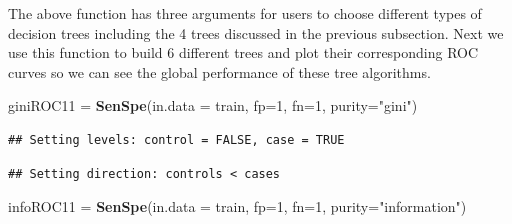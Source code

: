 \documentclass[
]{book}
\newenvironment{Shaded}{\begin{snugshade}}{\end{snugshade}}
\newcommand{\AttributeTok}[1]{\textcolor[rgb]{0.13,0.29,0.53}{#1}}
\newcommand{\DecValTok}[1]{\textcolor[rgb]{0.00,0.00,0.81}{#1}}
\newcommand{\DocumentationTok}[1]{\textcolor[rgb]{0.56,0.35,0.01}{\textbf{\textit{#1}}}}
\newcommand{\FunctionTok}[1]{\textcolor[rgb]{0.13,0.29,0.53}{\textbf{#1}}}
\newcommand{\NormalTok}[1]{#1}
\newcommand{\OtherTok}[1]{\textcolor[rgb]{0.56,0.35,0.01}{#1}}
\newcommand{\SpecialCharTok}[1]{\textcolor[rgb]{0.81,0.36,0.00}{\textbf{#1}}}
\newcommand{\StringTok}[1]{\textcolor[rgb]{0.31,0.60,0.02}{#1}}
\begin{document}
\begin{Shaded}
\end{Shaded}

The above function has three arguments for users to choose different types of decision trees including the 4 trees discussed in the previous subsection. Next we use this function to build 6 different trees and plot their corresponding ROC curves so we can see the global performance of these tree algorithms.

\begin{Shaded}
\begin{Highlighting}[]
\NormalTok{giniROC11 }\OtherTok{=} \FunctionTok{SenSpe}\NormalTok{(}\AttributeTok{in.data =}\NormalTok{ train, }\AttributeTok{fp=}\DecValTok{1}\NormalTok{, }\AttributeTok{fn=}\DecValTok{1}\NormalTok{, }\AttributeTok{purity=}\StringTok{"gini"}\NormalTok{)}
\end{Highlighting}
\end{Shaded}

\begin{verbatim}
## Setting levels: control = FALSE, case = TRUE
\end{verbatim}

\begin{verbatim}
## Setting direction: controls < cases
\end{verbatim}

\begin{Shaded}
\begin{Highlighting}[]
\NormalTok{infoROC11 }\OtherTok{=} \FunctionTok{SenSpe}\NormalTok{(}\AttributeTok{in.data =}\NormalTok{ train, }\AttributeTok{fp=}\DecValTok{1}\NormalTok{, }\AttributeTok{fn=}\DecValTok{1}\NormalTok{, }\AttributeTok{purity=}\StringTok{"information"}\NormalTok{)}
\end{Highlighting}
\end{Shaded}
\end{document}
